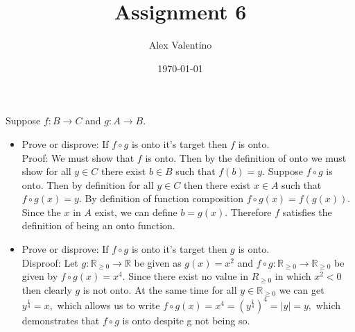 \documentclass[12pt, letterpaper]{article}
\date{\today}
\author{Alex Valentino}
\title{Assignment 6}
\newcommand{\R}{\mathbb{R}}
\begin{document}
Suppose $f : B \to C$ and $g: A \to B$.
\begin{itemize}
	\item Prove or disprove:  If $f \circ g$ is onto it's target then $f$ is onto.\\
	Proof:  We must show that $f$ is onto.  Then by the definition of onto we must show for all $y \in C$ there exist $b \in B$ such that $f(b) = y.$  Suppose $f \circ g$ is onto.  Then by definition for all $y \in C$ then there exist $x \in A$ such that $f \circ g (x) = y.$  By definition of function composition    $f \circ g(x) = f(g(x))$.  Since the $x$ in $A$ exist, we can define $b=g(x).$  Therefore $f$ satisfies the definition of being an onto function.
	\item Prove or disprove:  If $f \circ g$ is onto it's target then $g$ is onto. \\
	Disproof: Let $g: \R_{\geq 0} \to \R$ be given as $g(x) = x^2$ and $f \circ g: \R_{\geq 0} \to \R_{\geq 0}$ be given by $f \circ g (x) = x^4.$ Since there exist no value in $R_{\geq 0}$ in which $x^2 < 0$ then clearly $g$ is not onto.  At the same time for all $y\in \R_{\geq 0}$ we can get $y^{\frac{1}{4}}=x,$ which allows us to write $f\circ g (x) = x^4 = (y^{\frac{1}{4}})^4 = |y| = y,$ which demonstrates that $f \circ g$ is onto despite g not being so.    
\end{itemize}
\end{document}
